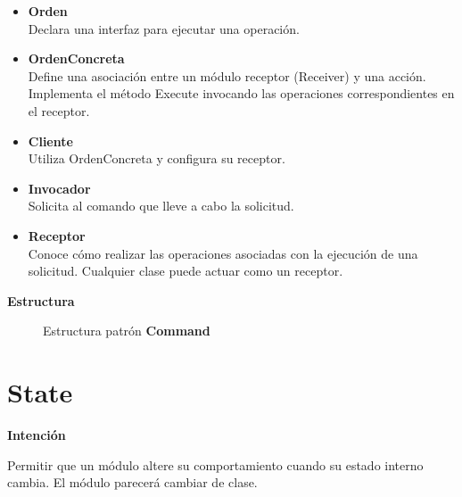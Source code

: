 \begin{itemize}
\item \textbf{Orden}\\
Declara una interfaz para ejecutar una operación.

\item \textbf{OrdenConcreta}\\
Define una asociación entre un módulo receptor (Receiver) y una acción.
Implementa el método Execute invocando las operaciones correspondientes en el receptor.

\item \textbf{Cliente}\\
Utiliza OrdenConcreta y configura su receptor.

\item \textbf{Invocador}\\
Solicita al comando que lleve a cabo la solicitud.

\item \textbf{Receptor}\\
Conoce cómo realizar las operaciones asociadas con la ejecución de una solicitud. Cualquier clase puede actuar como un receptor.
\end{itemize}


\textbf{Estructura}

\begin{figure}[h]
\caption{Estructura patrón \textbf{Command}}
\begin{center}
\end{center}
\end{figure}


\section{State}


\textbf{Intención}

Permitir que un módulo altere su comportamiento cuando su estado interno cambia. El módulo parecerá cambiar de clase.

